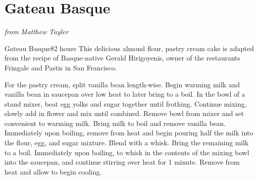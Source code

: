 \documentclass[openany]{book}
\begin{document}
\chapter{Gateau Basque}\label{gateau-basque}

\emph{from Matthew Tayler}

\begin{recipe}{Gateau Basque}{8}{2 hours}
\freeform This delicious almond flour, pastry cream cake is adapted from the recipe of Basque-native Gerald Hirigoyenis, owner of the restaurants Fringale and Pastis in San Francisco.


For the pastry cream, split vanilla bean length-wise. Begin warming milk and vanilla bean in saucepan over low heat to later bring to a boil.
In the bowl of a stand mixer, beat egg yolks and sugar together until frothing. Continue mixing, slowly add in flower and mix until combined. Remove bowl from mixer and set convenient to warming milk. Bring milk to boil and remove vanilla bean. Immediately upon boiling, remove from heat and begin pouring half the milk into the flour, egg, and sugar mixture. Blend with a whisk. Bring the remaining milk to a boil. Immediately upon boiling,  to whisk in the contents of the mixing bowl into the saucepan, and continue stirring over heat for 1 minute. Remove from heat and allow to begin cooling.   



\end{recipe}
\end{document}
